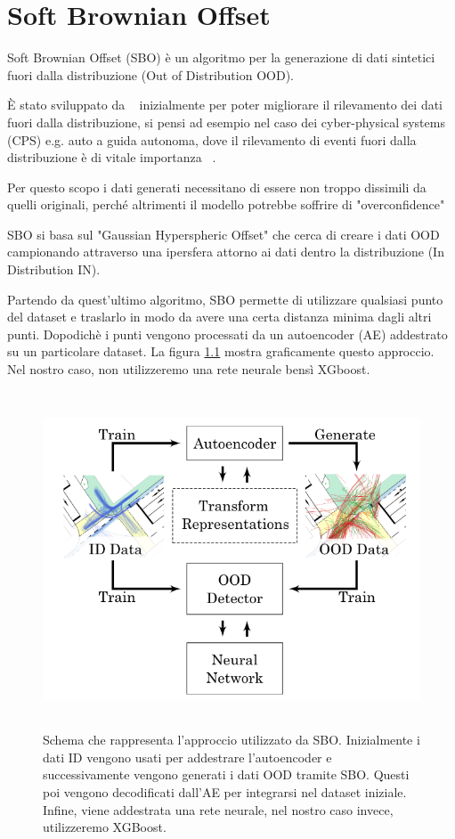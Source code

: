 \chapter{Soft Brownian Offset}

Soft Brownian Offset (SBO) è un algoritmo per la generazione di dati sintetici fuori dalla distribuzione (Out of Distribution OOD). 

È stato sviluppato da ~\cite{sbo} inizialmente per poter migliorare il rilevamento dei dati fuori dalla distribuzione, si pensi ad esempio nel caso dei cyber-physical systems (CPS) e.g. auto a guida autonoma, dove il rilevamento di eventi fuori dalla distribuzione è di vitale importanza ~\cite{yuhasEmbeddedOutofdistributionDetection2021}.

Per questo scopo i dati generati necessitano di essere non troppo dissimili da quelli originali, perché altrimenti il modello potrebbe soffrire di "overconfidence" ~\cite{amodeiConcreteProblemsAI2016}

SBO si basa sul "Gaussian Hyperspheric Offset" che cerca di creare i dati OOD campionando attraverso una ipersfera attorno ai dati dentro la distribuzione (In Distribution IN).

Partendo da quest'ultimo algoritmo, SBO permette di utilizzare qualsiasi punto del dataset e traslarlo in modo da avere una certa distanza minima dagli altri punti. Dopodichè i punti vengono processati da un autoencoder (AE) addestrato su un particolare dataset. La figura \ref{fig:sbo_schema} mostra graficamente questo approccio. Nel nostro caso, non utilizzeremo una rete neurale bensì XGboost.


\begin{figure}[htpb]
    \centering
    \includegraphics[width=\textwidth,height=10cm,keepaspectratio=true]{img/sbo_schema.png}
    \caption{
        Schema che rappresenta l'approccio utilizzato da SBO. Inizialmente i dati ID vengono usati per addestrare l'autoencoder e successivamente vengono generati i dati OOD tramite SBO. Questi poi vengono decodificati dall'AE per integrarsi nel dataset iniziale. Infine, viene addestrata una rete neurale, nel nostro caso invece, utilizzeremo XGBoost.
    }
    \label{fig:sbo_schema}
\end{figure}

